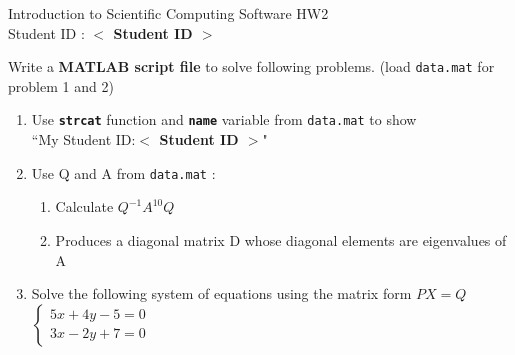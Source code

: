 \documentclass[12pt,a4paper]{article}
\newcommand{\placeholder}[1]{\textbf{$<$ #1 $>$}}
\newcommand{\idnumber}{\placeholder{Student ID}}
\begin{document}
\begin{flushleft}Introduction to Scientific Computing Software HW2
\\Student ID : \idnumber{}\end{flushleft}

Write a \textbf{MATLAB script file} to solve following problems. (load \texttt{data.mat} for problem 1 and 2)
\begin{enumerate}
\item Use \textbf{\texttt{strcat}} function and \textbf{\texttt{name}} variable from \texttt{data.mat} to show \\``My Student ID:\idnumber{}"
\item Use Q and A from \texttt{data.mat} :
\begin{enumerate}
\item  Calculate $Q^{-1}A^{10}Q$
\item  Produces a diagonal matrix D whose diagonal elements are eigenvalues of A
\end{enumerate}
\item Solve the following system of equations using the matrix form $PX=Q$ \\[1em] $\displaystyle{\left\{\begin{array}{l}5x+4y-5=0\\3x-2y+7=0\end{array}\right.}$
\end{enumerate}
\end{document}
